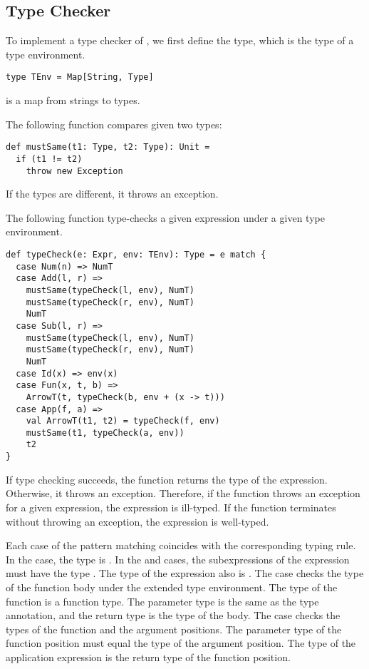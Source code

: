 \subsection{Type Checker}

To implement a type checker of \lang, we first define the  type,
which is the type of a type environment.

\begin{verbatim}
type TEnv = Map[String, Type]
\end{verbatim}

 is a map from strings to \lang types.

The following  function compares given two types:

\begin{verbatim}
def mustSame(t1: Type, t2: Type): Unit =
  if (t1 != t2)
    throw new Exception
\end{verbatim}

If the types are different, it throws an exception.

The following  function type-checks a given expression under a
given type environment.

\begin{verbatim}
def typeCheck(e: Expr, env: TEnv): Type = e match {
  case Num(n) => NumT
  case Add(l, r) =>
    mustSame(typeCheck(l, env), NumT)
    mustSame(typeCheck(r, env), NumT)
    NumT
  case Sub(l, r) =>
    mustSame(typeCheck(l, env), NumT)
    mustSame(typeCheck(r, env), NumT)
    NumT
  case Id(x) => env(x)
  case Fun(x, t, b) =>
    ArrowT(t, typeCheck(b, env + (x -> t)))
  case App(f, a) =>
    val ArrowT(t1, t2) = typeCheck(f, env)
    mustSame(t1, typeCheck(a, env))
    t2
}
\end{verbatim}

If type checking succeeds,
the function returns the type of the expression. Otherwise, it throws an exception.
Therefore, if the function throws an exception for a given expression, the
expression is ill-typed. If the function terminates without throwing an
exception, the expression is well-typed.

Each case of the pattern matching coincides with the corresponding typing rule. In the
 case, the type is . In the  and  cases,
the subexpressions of the expression must have the type . The type of
the expression also is . The  case checks the type of the
function body under the extended type environment. The type of the function is
a function type. The parameter type is the same as the type annotation, and the
return type is the type of the body. The  case
checks the types of the function and the argument positions. The parameter type of the
function position must equal the type of the argument position.
The type of the application expression
is the return type of the function position.

